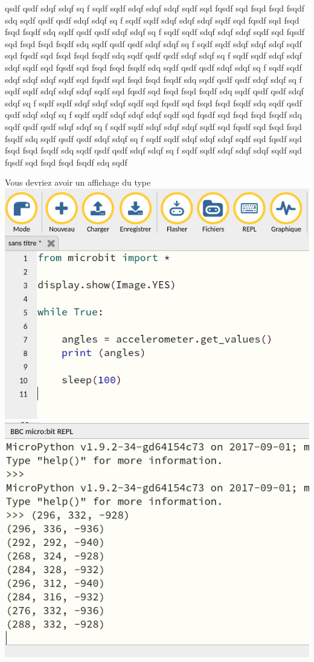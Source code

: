 qsdf qsdf sdqf sdqf sq f sqdf sqdf sdqf sdqf sdqf sqdf  sqd fqsdf sqd fsqd fsqd fsqdf sdq sqdf
qsdf qsdf sdqf sdqf sq f sqdf sqdf sdqf sdqf sdqf sqdf  sqd fqsdf sqd fsqd fsqd fsqdf sdq sqdf
qsdf qsdf sdqf sdqf sq f sqdf sqdf sdqf sdqf sdqf sqdf  sqd fqsdf sqd fsqd fsqd fsqdf sdq sqdf
qsdf qsdf sdqf sdqf sq f sqdf sqdf sdqf sdqf sdqf sqdf  sqd fqsdf sqd fsqd fsqd fsqdf sdq sqdf
qsdf qsdf sdqf sdqf sq f sqdf sqdf sdqf sdqf sdqf sqdf  sqd fqsdf sqd fsqd fsqd fsqdf sdq sqdf
qsdf qsdf sdqf sdqf sq f sqdf sqdf sdqf sdqf sdqf sqdf  sqd fqsdf sqd fsqd fsqd fsqdf sdq sqdf
qsdf qsdf sdqf sdqf sq f sqdf sqdf sdqf sdqf sdqf sqdf  sqd fqsdf sqd fsqd fsqd fsqdf sdq sqdf
qsdf qsdf sdqf sdqf sq f sqdf sqdf sdqf sdqf sdqf sqdf  sqd fqsdf sqd fsqd fsqd fsqdf sdq sqdf
qsdf qsdf sdqf sdqf sq f sqdf sqdf sdqf sdqf sdqf sqdf  sqd fqsdf sqd fsqd fsqd fsqdf sdq sqdf
qsdf qsdf sdqf sdqf sq f sqdf sqdf sdqf sdqf sdqf sqdf  sqd fqsdf sqd fsqd fsqd fsqdf sdq sqdf
qsdf qsdf sdqf sdqf sq f sqdf sqdf sdqf sdqf sdqf sqdf  sqd fqsdf sqd fsqd fsqd fsqdf sdq sqdf
qsdf qsdf sdqf sdqf sq f sqdf sqdf sdqf sdqf sdqf sqdf  sqd fqsdf sqd fsqd fsqd fsqdf sdq sqdf

\begin{remarque}
	Vous devriez avoir un affichage du type\\
		\includegraphics[width=0.5\linewidth,valign=t]{res/mu/050.png}
		\hfill
		\includegraphics[width=0.5\linewidth,valign=t]{res/mu/070.png}	
\end{remarque}



